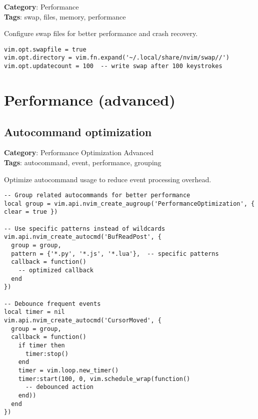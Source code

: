 {{{{{{{{{{\textbf{Category}: Performance\\ \textbf{Tags}: swap, files, memory, performance
\vspace{0.5cm}

Configure swap files for better performance and crash recovery.

\begin{Exa*}{}
\begin{Verbatim}[fontsize=\footnotesize, breaklines, breakanywhere]
vim.opt.swapfile = true
vim.opt.directory = vim.fn.expand('~/.local/share/nvim/swap//')
vim.opt.updatecount = 100  -- write swap after 100 keystrokes
\end{Verbatim}
\end{Exa*}

\chapter{Performance (advanced)}
\section{Autocommand optimization}

\textbf{Category}: Performance Optimization Advanced\\ \textbf{Tags}: autocommand, event, performance, grouping
\vspace{0.5cm}

Optimize autocommand usage to reduce event processing overhead.

\begin{Exa*}{}
\begin{Verbatim}[fontsize=\footnotesize, breaklines, breakanywhere]
-- Group related autocommands for better performance
local group = vim.api.nvim_create_augroup('PerformanceOptimization', { clear = true })

-- Use specific patterns instead of wildcards
vim.api.nvim_create_autocmd('BufReadPost', {
  group = group,
  pattern = {'*.py', '*.js', '*.lua'},  -- specific patterns
  callback = function()
    -- optimized callback
  end
})

-- Debounce frequent events
local timer = nil
vim.api.nvim_create_autocmd('CursorMoved', {
  group = group,
  callback = function()
    if timer then
      timer:stop()
    end
    timer = vim.loop.new_timer()
    timer:start(100, 0, vim.schedule_wrap(function()
      -- debounced action
    end))
  end
})
\end{Verbatim}
\end{Exa*}

}}}}}}}}}}
